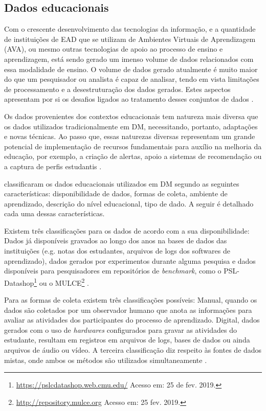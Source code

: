 \subsection{Dados educacionais}

Com o crescente desenvolvimento das tecnologias da informação, e a quantidade de
instituições de EAD que se utilizam de Ambientes Virtuais de Aprendizagem (AVA),
ou mesmo outras tecnologias de apoio ao processo de ensino e aprendizagem, está
sendo gerado um imenso volume de dados relacionados com essa modalidade de
ensino. O volume de dados gerado atualmente é muito maior do que um pesquisador
ou analista  é capaz de analisar, tendo em vista limitações de processamento e a
desestruturação dos dados gerados. Estes aspectos apresentam por si os desafios
ligados ao tratamento desses conjuntos de dados
\cite{rigo2014aplicaccoes,costa2012mineraccao}.

Os dados provenientes dos contextos educacionais tem natureza mais diversa que
os dados utilizados tradicionalmente em DM, necessitando, portanto, adaptações e
novas técnicas. Ao passo que, essas naturezas diversas representam um grande
potencial de implementação de recursos fundamentais para auxílio na melhoria da
educação, por exemplo, a criação de alertas, apoio a sistemas de recomendação ou
a captura de perfis estudantis \cite{rigo2014aplicaccoes}.

 classificaram os dados educacionais
utilizados em DM segundo as seguintes características: disponibilidade de dados,
formas de coleta, ambiente de aprendizado, descrição do nível educacional, tipo
de dado. A seguir é detalhado cada uma dessas características.

Existem três classificações para os dados de acordo com a sua disponibilidade:
Dados já disponíveis gravados ao longo dos anos na bases de dados das
instituições (e.g. notas dos estudantes, arquivos de logs dos softwares de
aprendizado), dados gerados por experimentos durante alguma pesquisa e dados
disponíveis para pesquisadores em repositórios de \textit{benchmark}, como o
PSL-Datashop\footnote{\url{https://pslcdatashop.web.cmu.edu/} Acesso em: 25 de
fev. 2019.} ou o MULCE\footnote{\url{http://repository.mulce.org} Acesso em: 25
fev. 2019.} \cite{bousbia2014contribution}.

Para as formas de coleta existem três classificações possíveis: Manual, quando
os dados são coletados por um observador humano que anota as informações para
avaliar as atividades dos participantes do processo de aprendizado. Digital,
dados gerados com o uso de \textit{hardwares} configurados para gravar as
atividades do estudante, resultam em registros em arquivos de logs, bases de
dados ou ainda arquivos de áudio ou vídeo. A terceira classificação diz respeito
às fontes de dados mistas, onde ambos os métodos são utilizados simultaneamente
\cite{bousbia2014contribution}.

